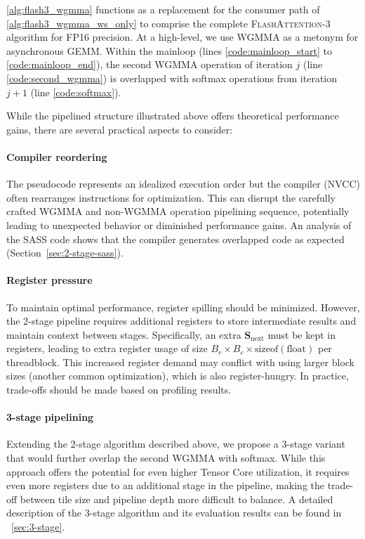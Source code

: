   \cref{alg:flash3_wgmma} functions as a replacement for the consumer path of \cref{alg:flash3_wgmma_ws_only} to comprise the complete \textsc{FlashAttention-3} algorithm for FP16 precision. At a high-level, we use WGMMA as a metonym for asynchronous GEMM. Within the mainloop (lines \ref{code:mainloop_start} to \ref{code:mainloop_end}), the second WGMMA operation of iteration $j$ (line \ref{code:second_wgmma}) is overlapped with softmax operations from iteration $j+1$ (line \ref{code:softmax}).

  While the pipelined structure illustrated above offers theoretical performance gains, there are several practical aspects to consider:
  \paragraph{Compiler reordering} The pseudocode represents an idealized execution order but the compiler (NVCC) often rearranges instructions for optimization. This can disrupt the carefully crafted WGMMA and non-WGMMA operation pipelining sequence, potentially leading to unexpected behavior or diminished performance gains. An analysis of the SASS code shows that the compiler generates overlapped code as expected (Section~\ref{sec:2-stage-sass}).
  \paragraph{Register pressure} To maintain optimal performance, register spilling should be minimized. However, the 2-stage pipeline requires additional registers to store intermediate results and maintain context between stages. Specifically, an extra $\mathbf{S}_{\mathrm{next}}$ must be kept in registers, leading to extra register usage of size $B_r \times B_c \times \text{sizeof}(\text{float})$ per threadblock. This increased register demand may conflict with using larger block sizes (another common optimization), which is also register-hungry. In practice, trade-offs should be made based on profiling results.
  \paragraph{3-stage pipelining} Extending the 2-stage algorithm described above, we propose a 3-stage variant that would further overlap the second WGMMA with softmax. While this approach offers the potential for even higher Tensor Core utilization, it requires even more registers due to an additional stage in the pipeline, making the trade-off between tile size and pipeline depth more difficult to balance. A detailed description of the 3-stage algorithm and its evaluation results can be found in ~\cref{sec:3-stage}.

